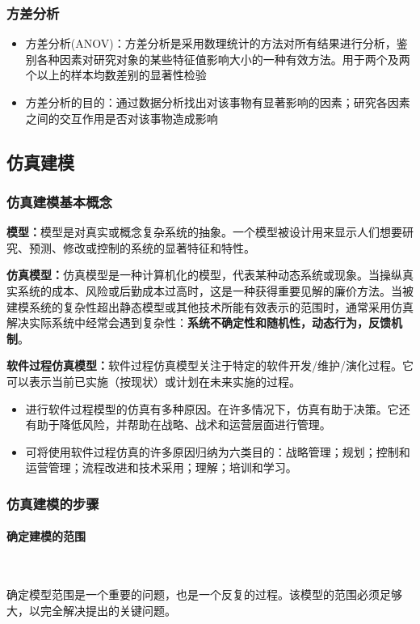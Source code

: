 \subsubsection{方差分析}
\begin{itemize}
    \item 方差分析(ANOV)：方差分析是采用数理统计的方法对所有结果进行分析，鉴别各种因素对研究对象的某些特征值影响大小的一种有效方法。用于两个及两个以上的样本均数差别的显著性检验
    \item 方差分析的目的：通过数据分析找出对该事物有显著影响的因素；研究各因素之间的交互作用是否对该事物造成影响
\end{itemize}

\subsection{仿真建模}
\subsubsection{仿真建模基本概念}
\textbf{模型：}模型是对真实或概念复杂系统的抽象。一个模型被设计用来显示人们想要研究、预测、修改或控制的系统的显著特征和特性。

\textbf{仿真模型：}仿真模型是一种计算机化的模型，代表某种动态系统或现象。当操纵真实系统的成本、风险或后勤成本过高时，这是一种获得重要见解的廉价方法。当被建模系统的复杂性超出静态模型或其他技术所能有效表示的范围时，通常采用仿真解决实际系统中经常会遇到复杂性：\textbf{系统不确定性和随机性，动态行为，反馈机制}。

\textbf{软件过程仿真模型：}软件过程仿真模型关注于特定的软件开发/维护/演化过程。它可以表示当前已实施（按现状）或计划在未来实施的过程。
\begin{itemize}
    \item 进行软件过程模型的仿真有多种原因。在许多情况下，仿真有助于决策。它还有助于降低风险，并帮助在战略、战术和运营层面进行管理。
    \item 可将使用软件过程仿真的许多原因归纳为六类目的：战略管理；规划；控制和运营管理；流程改进和技术采用；理解；培训和学习。
\end{itemize}

\subsubsection{仿真建模的步骤}
\paragraph*{确定建模的范围}~{} \par
确定模型范围是一个重要的问题，也是一个反复的过程。该模型的范围必须足够大，以完全解决提出的关键问题。

